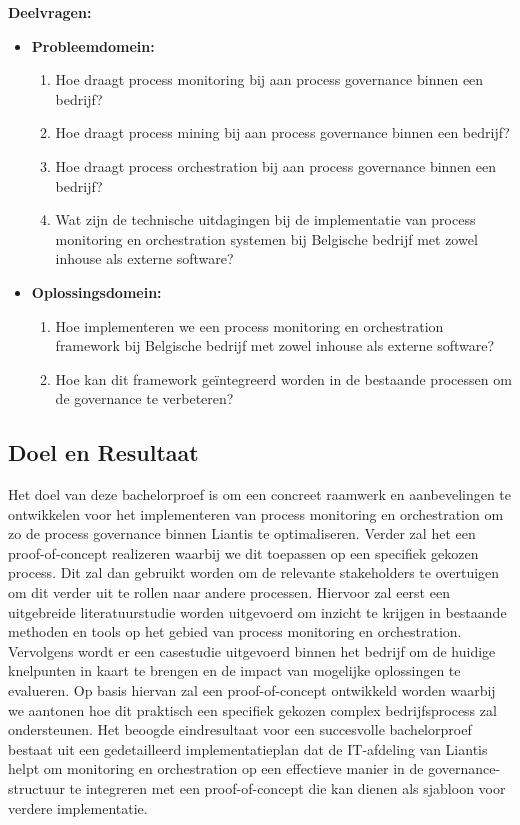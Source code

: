 \textbf{Deelvragen:}
\begin{itemize}
    \item \textbf{Probleemdomein:}
    \begin{enumerate}
        \item Hoe draagt process monitoring bij aan process governance binnen een bedrijf?
        \item Hoe draagt process mining bij aan process governance binnen een bedrijf?
        \item Hoe draagt process orchestration bij aan process governance binnen een bedrijf?
        \item Wat zijn de technische uitdagingen bij de implementatie van process monitoring en orchestration systemen bij Belgische bedrijf met zowel inhouse als externe software?
    \end{enumerate}
    
    \item \textbf{Oplossingsdomein:}
    \begin{enumerate}
        \item Hoe implementeren we een process monitoring en orchestration framework bij Belgische bedrijf met zowel inhouse als externe software?
        \item Hoe kan dit framework geïntegreerd worden in de bestaande processen om de governance te verbeteren?
    \end{enumerate}
\end{itemize}

\subsection{Doel en Resultaat}

Het doel van deze bachelorproef is om een concreet raamwerk en aanbevelingen te ontwikkelen voor het implementeren van process monitoring en orchestration om zo de process governance binnen Liantis te optimaliseren. Verder zal het een proof-of-concept realizeren waarbij we dit toepassen op een specifiek gekozen process. Dit zal dan gebruikt worden om de relevante stakeholders te overtuigen om dit verder uit te rollen naar andere processen.  Hiervoor zal eerst een uitgebreide literatuurstudie worden uitgevoerd om inzicht te krijgen in bestaande methoden en tools op het gebied van process monitoring en orchestration. Vervolgens wordt er een casestudie uitgevoerd binnen het bedrijf om de huidige knelpunten in kaart te brengen en de impact van mogelijke oplossingen te evalueren. Op basis hiervan zal een proof-of-concept ontwikkeld worden waarbij we aantonen hoe dit praktisch een specifiek gekozen complex bedrijfsprocess zal ondersteunen. Het beoogde eindresultaat voor een succesvolle bachelorproef bestaat uit een gedetailleerd implementatieplan dat de IT-afdeling van Liantis helpt om monitoring en orchestration op een effectieve manier in de governance-structuur te integreren met een proof-of-concept die kan dienen als sjabloon voor verdere implementatie. 

